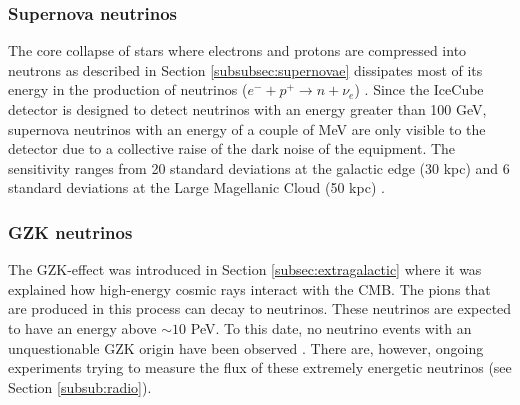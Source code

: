 
\subsubsection{Supernova neutrinos}
The core collapse of stars where electrons and protons are compressed into neutrons as described in Section \ref{subsubsec:supernovae} dissipates most of its energy in the production of neutrinos ($e^- + p^+ \rightarrow n + \nu_e$) \cite{Scholberg:2012id}. Since the IceCube detector is designed to detect neutrinos with an energy greater than 100 GeV, supernova neutrinos with an energy of a couple of MeV are only visible to the detector due to a collective raise of the dark noise of the equipment. The sensitivity ranges from 20 standard deviations at the galactic edge (30 kpc) and 6 standard deviations at the Large Magellanic Cloud (50 kpc) \cite{Kopke:2011xb}.

\subsubsection{GZK neutrinos}
The GZK-effect was introduced in Section \ref{subsec:extragalactic} where it was explained how high-energy cosmic rays interact with the CMB. The pions that are produced in this process can decay to neutrinos. These neutrinos are expected to have an energy above $\sim 10$ PeV. To this date, no neutrino events with an unquestionable GZK origin have been observed \cite{Ishihara:2017szg}. There are, however, ongoing experiments trying to measure the flux of these extremely energetic neutrinos (see Section \ref{subsub:radio}).





